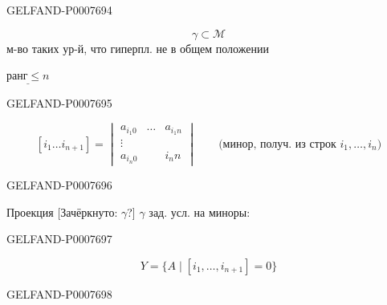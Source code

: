 \begin{GelfandAdjacentEvidence}{GELFAND-P000769}{4}


\[
\gamma\subset\mathcal M
\]
м-во таких ур-й, что гиперпл. не в общем положении

\(\underline{\text{ранг}\le n}\)
\end{GelfandAdjacentEvidence}
\begin{GelfandAdjacentEvidence}{GELFAND-P000769}{5}


\[
[i_1\ldots i_{n+1}]=
\begin{vmatrix}
a_{i_1 0}&\ldots&a_{i_1 n}\\
\vdots&&\\
a_{i_n 0}&&i_n n
\end{vmatrix}
\qquad\text{(минор, получ. из строк }i_1,\ldots,i_n\text{)}
\]
\end{GelfandAdjacentEvidence}
\begin{GelfandAdjacentEvidence}{GELFAND-P000769}{6}


Проекция [Зачёркнуто: \(\gamma\)?] \(\gamma\) зад. усл. на миноры:
\end{GelfandAdjacentEvidence}
\begin{GelfandAdjacentEvidence}{GELFAND-P000769}{7}

\begin{equation*}
\tag{6}
Y=\{A\mid[i_1,\ldots,i_{n+1}]=0\}
\end{equation*}
\end{GelfandAdjacentEvidence}
\begin{GelfandAdjacentEvidence}{GELFAND-P000769}{8}

\end{GelfandAdjacentEvidence}



